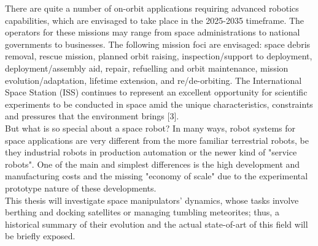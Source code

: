 \documentclass[a4paper,12pt,oneside]{report}
\begin{document}
There are quite a number of on-orbit applications requiring advanced robotics capabilities, which
are envisaged to take place in the 2025-2035 timeframe. The operators for these missions may
range from space administrations to national governments to businesses. The following mission
foci are envisaged: space debris removal, rescue mission, planned orbit raising,
inspection/support to deployment, deployment/assembly aid, repair, refuelling and orbit
maintenance, mission evolution/adaptation, lifetime extension, and re/de-orbiting. The
International Space Station (ISS) continues to represent an excellent opportunity for scientific
experiments to be conducted in space amid the unique characteristics, constraints and pressures that the environment brings [3].\\
But what is so special about a space robot? In many ways, robot systems for space applications are very different from the more familiar terrestrial robots, be they industrial robots in production automation or the newer kind of "service robots". One of the main and simplest differences is the high development and manufacturing costs and the missing "economy of scale" due to the experimental prototype nature of these developments.\\
This thesis will investigate space manipulators' dynamics, whose tasks involve berthing and docking satellites or managing tumbling meteorites; thus, a historical summary of their evolution and the actual state-of-art of this field will be briefly exposed.
\end{document}
